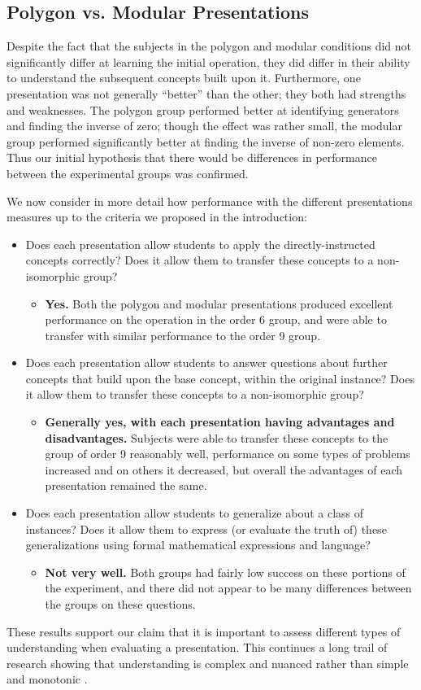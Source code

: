 \documentclass[man,10pt]{apa6}
\begin{document}
\subsection{Polygon vs. Modular Presentations}
Despite the fact that the subjects in the polygon and modular conditions did not significantly differ at learning the initial operation, they did differ in their ability to understand the subsequent concepts built upon it. Furthermore, one presentation was not generally ``better'' than the other; they both had strengths and weaknesses. The polygon group performed better at identifying generators and finding the inverse of zero; though the effect was rather small, the modular group performed significantly better at finding the inverse of non-zero elements. Thus our initial hypothesis that there would be differences in performance between the experimental groups was confirmed. \par 
We now consider in more detail how performance with the different presentations measures up to the criteria we proposed in the introduction:
\begin{itemize}
\item Does each presentation allow students to apply the directly-instructed concepts correctly? Does it allow them to transfer these concepts to a non-isomorphic group?
\begin{itemize}
\item[] \textbf{Yes.} Both the polygon and modular presentations produced excellent performance on the operation in the order 6 group, and were able to transfer with similar performance to the order 9 group.
\end{itemize}
\item Does each presentation allow students to answer questions about further concepts that build upon the base concept, within the original instance? Does it allow them to transfer these concepts to a non-isomorphic group?
\begin{itemize}
\item[] \textbf{Generally yes, with each presentation having advantages and disadvantages.} Subjects were able to transfer these concepts to the group of order 9 reasonably well, performance on some types of problems increased and on others it decreased, but overall the advantages of each presentation remained the same. 
\end{itemize}
\item Does each presentation allow students to generalize about a class of instances? Does it allow them to express (or evaluate the truth of) these generalizations using formal mathematical expressions and language? 
\begin{itemize}
\item[] \textbf{Not very well.} Both groups had fairly low success on these portions of the experiment, and there did not appear to be many differences between the groups on these questions.
\end{itemize}
\end{itemize}
These results support our claim that it is important to assess different types of understanding when evaluating a presentation. This continues a long trail of research showing that understanding is complex and nuanced rather than simple and monotonic \cite{Greeno1987,Bisanz1992}.
\end{document}
